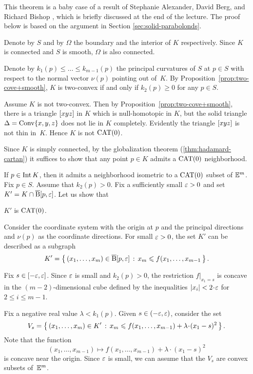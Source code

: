 This theorem is a baby case of a result of Stephanie Alexander, David Berg, and Richard Bishop \cite{alexander-berg-bishop}, which is briefly discussed at the end of the lecture.
The proof below is based on the argument in Section \ref{sec:solid-parabolonds}.

Denote by $S$  and by $\Omega$ the boundary and the interior of $K$ respectively. 
Since $K$ is connected and $S$ is smooth, $\Omega$ is also connected.

Denote by $k_1(p)\le\dots\le k_{m-1}(p)$ the principal curvatures of $S$ at $p\in S$ with respect to the normal vector $\nu(p)$ pointing out of~$K$.
By Proposition~\ref{prop:two-cove+smooth}, $K$ is two-convex if and only if $k_2(p)\ge 0$ for any $p\in S$.

Assume $K$ is not two-convex.
Then by Proposition~\ref{prop:two-cove+smooth}, there is a triangle $[xyz]$ in $K$ which is null-homotopic in $K$,
but the solid triangle $\Delta=\mathop{\rm Conv}\nolimits\{x,y,z\}$ does not lie in $K$ completely.
Evidently the triangle $[xyz]$ is not thin in~$K$. 
Hence $K$ is not $\mathrm{CAT}(0)$.

Since $K$ is simply connected,
by the globalization theorem (\ref{thm:hadamard-cartan})
it suffices to show that any point $p\in K$ admits a $\mathrm{CAT}(0)$ neighborhood.

If $p\in\operatorname{\rm Int}\nolimits K$, then it admits a neighborhood isometric to a $\mathrm{CAT}(0)$ subset of $\mathbb{E}^m$.
Fix $p\in S$.
Assume that $k_2(p)>0$.
Fix a sufficiently small $\varepsilon>0$ and set $K'=K\cap \overline{\mathrm{B}}{}[p,\varepsilon]$.
Let us show that 
\begin{clm}{}\label{K'-is-CAT}
$K'$ is $\mathrm{CAT}(0)$.
\end{clm}

Consider the coordinate system with the origin at $p$
and the principal directions and $\nu(p)$ as the coordinate directions.
For small $\varepsilon>0$, the set $K'$ 
can be described as a subgraph
\[K'
=
\left\{\,{(x_1,\dots,x_m)\in \overline{\mathrm{B}}{}[p,\varepsilon]}\,:\,{x_m\leqslant f(x_1,\dots,x_{m-1}}\,\right\}.\]

Fix $s\in[-\varepsilon,\varepsilon]$.
Since $\varepsilon$ is small and $k_2(p)>0$, the restriction 
$f|_{x_1=s}$
is concave in the $(m-2)$-dimensional cube defined by the inequalities $|x_i|<2\cdot\eps$ for $2\le i\le m-1$.

Fix a negative real value $\lambda<k_1(p)$.
Given $s\in (-\varepsilon,\varepsilon)$,
consider the set 
\[V_s
=
\set
{(x_1,\dots,x_m)\in K'}
{x_m\le f(x_1,\dots,x_{m-1})+\lambda\cdot (x_1-s)^2}.\]
Note that the function 
\[(x_1,\dots, x_{m-1})\mapsto f(x_1,\dots,x_{m-1})+\lambda\cdot (x_1-s)^2\]
is concave near the origin.
Since $\varepsilon$ is small, we can assume that the $V_s$ are convex subsets of~$\mathbb{E}^m$.

